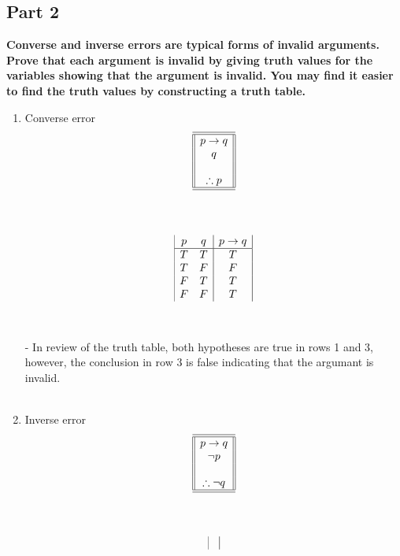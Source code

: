 \documentclass{amsart}
\theoremstyle{definition}
\theoremstyle{Exercise}
\theoremstyle{remark}
\theoremstyle{rule}
\numberwithin{equation}{section}
\begin{document}
\subsection*{Part 2}
{\bf Converse and inverse errors are typical forms of invalid arguments. Prove that each argument is invalid by giving truth values for the variables showing that the argument is invalid. You may find it easier to find the truth values by constructing a truth table.}\\
 \begin{enumerate}[label=(\alph*)]
\item Converse error
\[
\begin{array}{||c||}
\hline \hline
p \to q\\
q\\
\\
\therefore p\\
\hline \hline
\end{array}
\]\\\\
\begin{displaymath}
  \begin{array}{| c c | c |}
    p & q & p \to q\\
    \hline
    T & T & T\\
    T & F & F\\
    F & T & T\\
    F & F & T\\
  \end{array}
\end{displaymath}
 \\\\
 - In review of the truth table, both hypotheses are true in rows 1 and 3, however, the conclusion in row 3 is false indicating that the argumant is invalid.
 \\\\
\item Inverse error
\[
\begin{array}{||c||}
\hline \hline
p \to q\\
\neg p\\
\\
\therefore \neg q\\
\hline \hline
\end{array}
\]\\\\
\begin{displaymath}
  \begin{array}{| c | c | c | c | c |}\\

\end{array}
\end{displaymath}
\end{enumerate}
\end{document}
